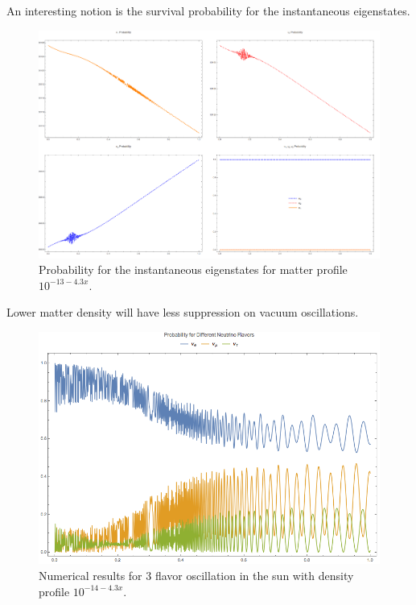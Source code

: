 \documentclass[letterpaper,12pt,english]{sphinxmanual}
\begin{document}
An interesting notion is the survival probability for the instantaneous eigenstates.
\begin{figure}[htbp]
\centering
\capstart

\includegraphics{instanEigenstetes-minus13-Grid.png}
\caption{Probability for the instantaneous eigenstates for matter profile \(10^{-13 - 4.3 x}\).}\end{figure}

Lower matter density will have less suppression on vacuum oscillations.
\begin{figure}[htbp]
\centering
\capstart

\includegraphics{numericalMSW3Flavor-minus14matter.png}
\caption{Numerical results for 3 flavor oscillation in the sun with density profile \(10^{-14 - 4.3 x}\).}\end{figure}
\end{document}
